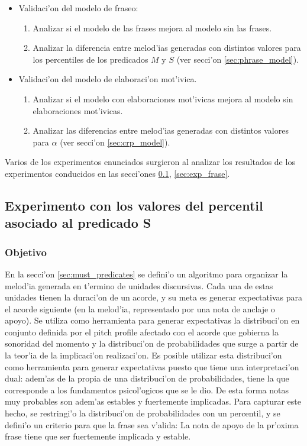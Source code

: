 \begin{itemize}
  \item Validaci'on del modelo de fraseo:
    \begin{enumerate}
      \item Analizar si el modelo de las frases mejora al modelo sin las frases.
      \item Analizar la diferencia entre melod'ias generadas con distintos valores para los percentiles de los predicados $M$ y $S$ (ver secci'on \ref{sec:phrase_model}).
    \end{enumerate}


  \item Validaci'on del modelo de elaboraci'on mot'ivica.
    \begin{enumerate}
      \item Analizar si el modelo con elaboraciones mot'ivicas mejora al modelo sin elaboraciones mot'ivicas.
      \item Analizar las diferencias entre melod'ias generadas con distintos valores para $\alpha$ (ver secci'on \ref{sec:crp_model}).

    \end{enumerate}



\end{itemize}

Varios de los experimentos enunciados surgieron al analizar los resultados de los experimentos conducidos en las secci'ones \ref{sec:exp_percentiles}, 
\ref{sec:exp_frase}.

\subsection{Experimento con los valores del percentil asociado al predicado S}
\label{sec:exp_percentiles}
\subsubsection{Objetivo}
En la secci'on \ref{sec:must_predicates} se defini'o un algoritmo para organizar la melod'ia generada en t'ermino de unidades discursivas. Cada una de estas
unidades tienen la duraci'on de un acorde, y su meta es generar expectativas para el acorde siguiente (en la melod'ia, representado por una nota de anclaje
o apoyo). Se utiliza como herramienta para generar expectativas la distribuci'on en conjunto definida por el pitch profile afectado con el acorde que 
gobierna la sonoridad del momento y la distribuci'on de probabilidades que surge a partir de la teor'ia de la implicaci'on realizaci'on. Es posible 
utilizar esta distribuci'on como herramienta para generar expectativas puesto que tiene una interpretaci'on dual: adem'as de la propia de una distribuci'on 
de probabilidades, tiene la que corresponde a los fundamentos psicol'ogicos que se le dio. De esta forma notas muy probables son adem'as estables y 
fuertemente implicadas. Para capturar este hecho, se restringi'o la distribuci'on de probabilidades con un percentil, y se defini'o un criterio para que la 
frase sea v'alida: La nota de apoyo de la pr'oxima frase tiene que ser fuertemente implicada y estable.

